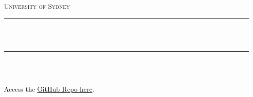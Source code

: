 \begin{titlepage}

\newcommand{\HRule}{\rule{\linewidth}{0.5mm}}

\center %
 

\textsc{\LARGE University of Sydney}\\[1.5cm] %



\HRule \\[0.4cm]
{ \huge \bfseries \reporttitle}\\[0.4cm] %
\HRule \\[1.5cm]
 

\begin{minipage}{0.4\textwidth}
\begin{center}\large 
\authorname\\\vspace{1cm}
Access the \href{https://github.com/Julian-Guinane/AERO2705-Report-Template}{GitHub Repo here}.
\authorSID\\\vspace{1cm}


\end{center}
\end{minipage}
\vspace{1mm}




\end{titlepage}
